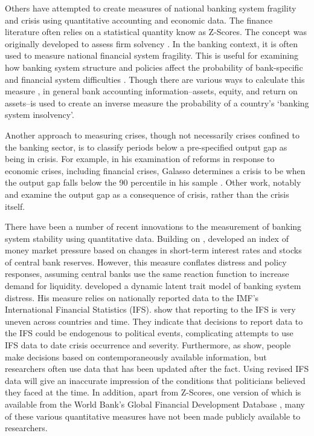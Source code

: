 \documentclass[]{article}
\begin{document}
Others have attempted to create measures of national banking system fragility and crisis using quantitative accounting and economic data. The finance literature often relies on a statistical quantity know as Z-Scores. The concept was originally developed to assess firm solvency \cite{roy1952}. In the banking context, it is often used to measure national financial system fragility. This is useful for examining how banking system structure and policies affect the probability of bank-specific and financial system difficulties \citep[e.g.][]{beck2013bank,vcihak2010islamic,laeven2009bank,uhde2009}. Though there are various ways to calculate this measure \citep[73]{Lepetit2013}, in general bank accounting information--assets, equity, and return on assets--is used to create an inverse measure the probability of a country's `banking system insolvency'.

Another approach to measuring crises, though not necessarily crises confined to the banking sector, is to classify periods below a pre-specified output gap as being in crisis. For example, in his examination of reforms in response to economic crises, including financial crises, Galasso determines a crisis to be when the output gap falls below the 90 percentile in his sample \citeyearpar[154]{galasso2014}. Other work, notably \cite{laeven2013} and \cite{Reinhart2009} examine the output gap as a consequence of crisis, rather than the crisis itself.

There have been a number of recent innovations to the measurement of banking system stability using quantitative data. Building on \cite{vonHagen2007}, \cite{Jing2015} developed an index of money market pressure based on changes in short-term interest rates and stocks of central bank reserves. However, this measure conflates distress and policy responses, assuming central banks use the same reaction function to increase demand for liquidity. \cite{Rosas2009} developed a dynamic latent trait model of banking system distress. His measure relies on nationally reported data to the IMF's International Financial Statistics (IFS). \cite{GandrudCopHal2015} show that reporting to the IFS is very uneven across countries and time. They indicate that decisions to report data to the IFS could be endogenous to political events, complicating attempts to use IFS data to date crisis occurrence and severity. Furthermore, as \cite{KayserLeininger2015} show, people make decisions based on contemporaneously available information, but researchers often use data that has been updated after the fact. Using revised IFS data will give an inaccurate impression of the conditions that politicians believed they faced at the time. In addition, apart from Z-Scores, one version of which is available from the World Bank's Global Financial Development Database \citep{worldbank2013}, many of these various quantitative measures have not been made publicly available to researchers.
\end{document}
